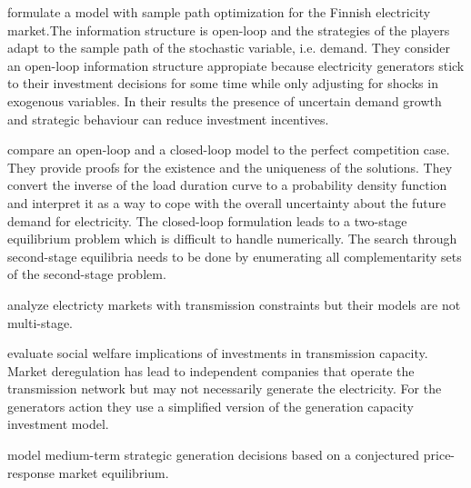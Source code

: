\cite{Chuang2001}

\cite{Ventosa2002}

\cite{Hogendorn2003}

\cite{Chaton2003}

\cite{Pineau2003} formulate a model with sample path optimization for the Finnish electricity market.The information structure is open-loop and the strategies of the players adapt to the sample path of the stochastic variable, i.e. demand. They consider an open-loop information structure appropiate because electricity generators stick to their investment decisions for some time while only adjusting for shocks in exogenous variables. In their results the presence of uncertain demand growth and strategic behaviour can reduce investment incentives.

\cite{Murphy2005} compare an open-loop and a closed-loop model to the perfect competition case. They provide proofs for the existence and the uniqueness of the solutions. They convert the inverse of the load duration curve to a probability density function and interpret it as a way to cope with the overall uncertainty about the future demand for electricity. The closed-loop formulation leads to a two-stage equilibrium problem which is difficult to handle numerically. The search through second-stage equilibria needs to be done by enumerating all complementarity sets of the second-stage problem.

\cite{Neuhoff2005} analyze electricty markets with transmission constraints but their models are not multi-stage.

\cite{Sauma2006} evaluate social welfare implications of investments in transmission capacity. Market deregulation has lead to independent companies that operate the transmission network but may not necessarily generate the electricity. For the generators action they use a simplified version of the \cite{Murphy2005} generation capacity investment model.

\cite{Barmack2007}

\cite{Centeno2007} model medium-term strategic generation decisions based on a conjectured price-response market equilibrium.

\cite{Genc2007}

\cite{Kiesling2007}





